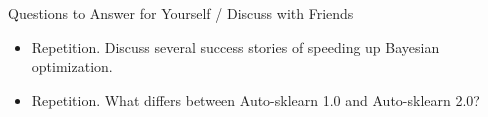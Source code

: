 \begin{frame}{Questions to Answer for Yourself / Discuss with Friends}

\begin{itemize}
    \item \alert{Repetition.} Discuss several success stories of speeding up Bayesian optimization.

    \item \alert{Repetition.} What differs between Auto-sklearn 1.0 and Auto-sklearn 2.0?
\end{itemize}

\end{frame}

